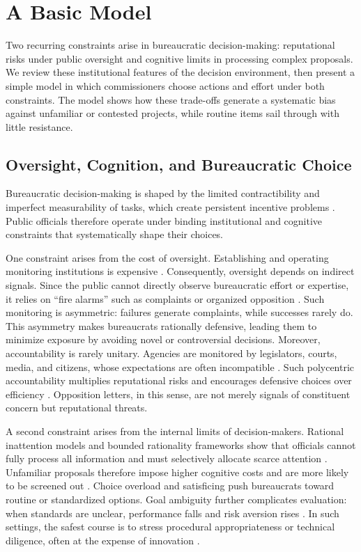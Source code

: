 \section{A Basic Model}

Two recurring constraints arise in bureaucratic decision-making: reputational risks under public oversight and cognitive limits in processing complex proposals. We review these institutional features of the decision environment, then present a simple model in which commissioners choose actions and effort under both constraints. The model shows how these trade-offs generate a systematic bias against unfamiliar or contested projects, while routine items sail through with little resistance.

\subsection{Oversight, Cognition, and Bureaucratic Choice}

Bureaucratic decision-making is shaped by the limited contractibility and imperfect measurability of tasks, which create persistent incentive problems \citep{Dixit2002}. Public officials therefore operate under binding institutional and cognitive constraints that systematically shape their choices.

One constraint arises from the cost of oversight. Establishing and operating monitoring institutions is expensive \citep{HuberShipan2000,DamonteDunlopRadaelli2014}. Consequently, oversight depends on indirect signals. Since the public cannot directly observe bureaucratic effort or expertise, it relies on ``fire alarms'' such as complaints or organized opposition \citep{Prendergast2003}. Such monitoring is asymmetric: failures generate complaints, while successes rarely do. This asymmetry makes bureaucrats rationally defensive, leading them to minimize exposure by avoiding novel or controversial decisions. Moreover, accountability is rarely unitary. Agencies are monitored by legislators, courts, media, and citizens, whose expectations are often incompatible \citep{Black2008,MaggettiPapadopoulos2018}. Such polycentric accountability multiplies reputational risks and encourages defensive choices over efficiency \citep{CarpenterKrause2012,GiladMaorBloom2015,BusuiocLodge2016}. Opposition letters, in this sense, are not merely signals of constituent concern but reputational threats.

A second constraint arises from the internal limits of decision-makers. Rational inattention models \citep{HebertWoodford2023} and bounded rationality frameworks \citep{deClippelRozen2021} show that officials cannot fully process all information and must selectively allocate scarce attention \citep{BesleyGhatak2003}. Unfamiliar proposals therefore impose higher cognitive costs and are more likely to be screened out \citep{DeFrancescoRadaelliTroeger2012}. Choice overload and satisficing push bureaucrats toward routine or standardized options. Goal ambiguity further complicates evaluation: when standards are unclear, performance falls and risk aversion rises \citep{AndersonStritch2016}. In such settings, the safest course is to stress procedural appropriateness or technical diligence, often at the expense of innovation \citep{Gilad2015,Duvanova2012}.

